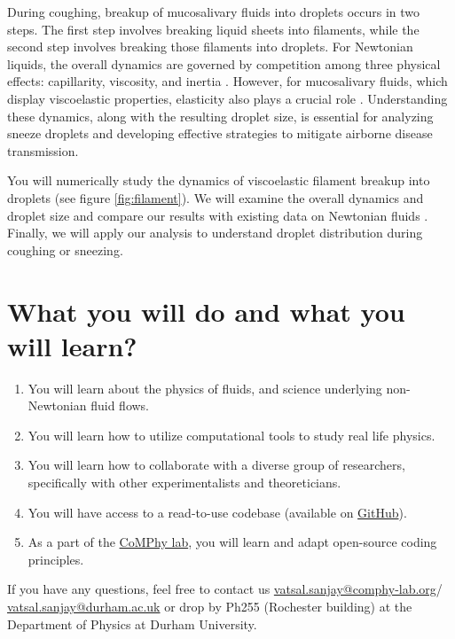 \documentclass[11pt]{article}
\begin{document}
During coughing, breakup of mucosalivary fluids into droplets occurs in two steps. The first step involves breaking liquid sheets into filaments, while the second step involves breaking those filaments into droplets. For Newtonian liquids, the overall dynamics are governed by competition among three physical effects: capillarity, viscosity, and inertia \citep{anthony2019dynamics}. However, for mucosalivary fluids, which display viscoelastic properties, elasticity also plays a crucial role \citep{sen2021retraction, liu2022contraction}. Understanding these dynamics, along with the resulting droplet size, is essential for analyzing sneeze droplets and developing effective strategies to mitigate airborne disease transmission.

You will numerically study the dynamics of viscoelastic filament breakup into droplets (see figure \ref{fig:filament}). We will examine the overall dynamics and droplet size and compare our results with existing data on Newtonian fluids \citep{anthony2019dynamics}. Finally, we will apply our analysis to understand droplet distribution during coughing or sneezing. 

\section*{What you will do and what you will learn?}
\begin{enumerate}
\item You will learn about the physics of fluids, and science underlying non-Newtonian fluid flows. 
\item You will learn how to utilize computational tools to study real life physics. 
\item You will learn how to collaborate with a diverse group of researchers, specifically with other experimentalists and theoreticians.
\item You will have access to a read-to-use codebase (available on \href{https://github.com/comphy-lab/multirheoflow}{GitHub}).
\item As a part of the \href{https://comphy-lab.org}{CoMPhy lab}, you will learn and adapt open-source coding principles. 

\end{enumerate}

If you have any questions, feel free to contact us \href{mailto:vatsal.sanjay@comphy-lab.org}{vatsal.sanjay@comphy-lab.org}/\\\href{mailto:vatsal.sanjay@durham.ac.uk}{vatsal.sanjay@durham.ac.uk} or drop by Ph255 (Rochester building) at the Department of Physics at Durham University.
\end{document}
